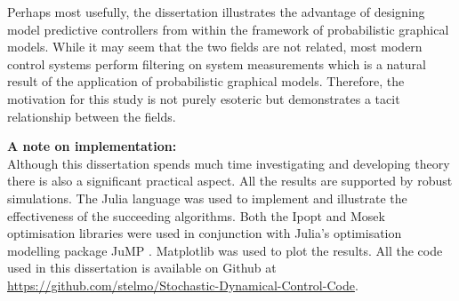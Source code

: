 Perhaps most usefully, the dissertation illustrates the advantage of designing model predictive controllers from within the framework of probabilistic graphical models. While it may seem that the two fields are not related, most modern control systems perform filtering on system measurements which is a natural result of the application of probabilistic graphical models. Therefore, the motivation for this study is not purely esoteric but demonstrates a tacit relationship between the fields.   

\textbf{A note on implementation:}\\
Although this dissertation spends much time investigating and developing theory there is also a significant practical aspect. All the results are supported by robust simulations. The Julia language \cite{julia} was used to implement and illustrate the effectiveness of the succeeding algorithms. Both the Ipopt \cite{ipopt} and Mosek \cite{mosek} optimisation libraries were used in conjunction with Julia's optimisation modelling package JuMP \cite{jump}. Matplotlib \cite{pyplot} was used to plot the results. All the code used in this dissertation is available on Github at \url{https://github.com/stelmo/Stochastic-Dynamical-Control-Code}.
